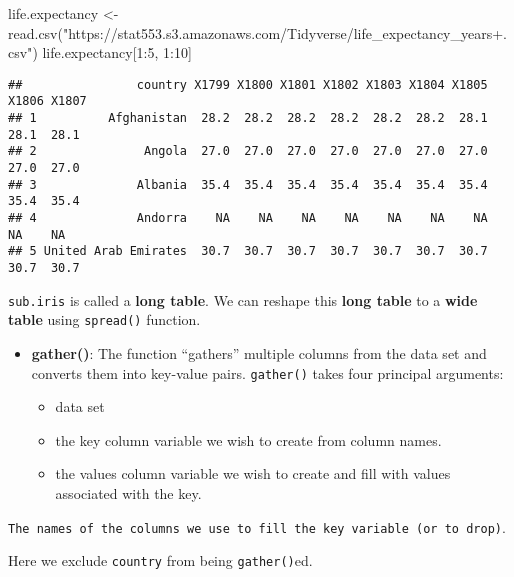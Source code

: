 \documentclass[
]{article}
\newenvironment{Shaded}{\begin{snugshade}}{\end{snugshade}}
\newcommand{\DecValTok}[1]{\textcolor[rgb]{0.00,0.00,0.81}{#1}}
\newcommand{\FunctionTok}[1]{\textcolor[rgb]{0.00,0.00,0.00}{#1}}
\newcommand{\NormalTok}[1]{#1}
\newcommand{\OtherTok}[1]{\textcolor[rgb]{0.56,0.35,0.01}{#1}}
\newcommand{\SpecialCharTok}[1]{\textcolor[rgb]{0.00,0.00,0.00}{#1}}
\newcommand{\StringTok}[1]{\textcolor[rgb]{0.31,0.60,0.02}{#1}}
\providecommand{\tightlist}{%
  \setlength{\itemsep}{0pt}\setlength{\parskip}{0pt}}
\begin{document}
\begin{Shaded}
\begin{Highlighting}[]
\NormalTok{life.expectancy }\OtherTok{\textless{}{-}}\FunctionTok{read.csv}\NormalTok{(}\StringTok{"https://stat553.s3.amazonaws.com/Tidyverse/life\_expectancy\_years+.csv"}\NormalTok{)}
\NormalTok{life.expectancy[}\DecValTok{1}\SpecialCharTok{:}\DecValTok{5}\NormalTok{, }\DecValTok{1}\SpecialCharTok{:}\DecValTok{10}\NormalTok{]}
\end{Highlighting}
\end{Shaded}

\begin{verbatim}
##                country X1799 X1800 X1801 X1802 X1803 X1804 X1805 X1806 X1807
## 1          Afghanistan  28.2  28.2  28.2  28.2  28.2  28.2  28.1  28.1  28.1
## 2               Angola  27.0  27.0  27.0  27.0  27.0  27.0  27.0  27.0  27.0
## 3              Albania  35.4  35.4  35.4  35.4  35.4  35.4  35.4  35.4  35.4
## 4              Andorra    NA    NA    NA    NA    NA    NA    NA    NA    NA
## 5 United Arab Emirates  30.7  30.7  30.7  30.7  30.7  30.7  30.7  30.7  30.7
\end{verbatim}

\texttt{sub.iris} is called a \textbf{long table}. We can reshape this
\textbf{long table} to a \textbf{wide table} using \texttt{spread()}
function.

\begin{itemize}
\item
  \textbf{gather()}: The function ``gathers'' multiple columns from the
  data set and converts them into key-value pairs. \texttt{gather()}
  takes four principal arguments:

  \begin{itemize}
  \tightlist
  \item
    data set
  \item
    the key column variable we wish to create from column names.
  \item
    the values column variable we wish to create and fill with values
    associated with the key.
  \end{itemize}
\end{itemize}

\texttt{The\ names\ of\ the\ columns\ we\ use\ to\ fill\ the\ key\ variable\ (or\ to\ drop)}.

Here we exclude \texttt{country} from being \texttt{gather()}ed.
\end{document}
